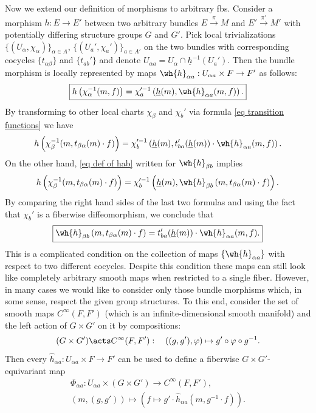 Now we extend our definition of morphisms to arbitrary \glspl{fb}. Consider a morphism $h:E\to E'$ between two arbitrary bundles $E\overset{\pi}{\to}M$ and $E'\overset{\pi'}{\to}M'$ with potentially differing structure groups $G$ and $G'$. Pick local trivializations $\{(U_\alpha,\chi_\alpha)\}_{\alpha\in A}$, $\{(U_a',\chi_a')\}_{a\in A'}$ on the two bundles with corresponding cocycles $\{t_{\alpha\beta}\}$ and $\{t_{ab}'\}$ and denote $U_{\alpha a}=U_\alpha\cap \underline{h}^{-1}(U_a')$. Then the bundle morphism is locally represented by maps
$\wh{h}_{\alpha a}:U_{\alpha a}\times F\to F'$ as follows: 
\[\boxed{h\left(\chi_\alpha^{-1}(m,f)\right)=\chi_a^{\prime-1}\left(\underline{h}(m),\wh{h}_{\alpha a}(m,f)\right).}\label{eq def of hab}\]
By transforming to other local charts $\chi_\beta$ and $\chi_b'$ via formula \eqref{eq transition functions} we have
\[h\left(\chi_\beta^{-1}(m,t_{\beta\alpha}(m)\cdot f)\right)=\chi_b^{\prime-1}\left(\underline{h}(m),t_{ba}'(\underline{h}(m))\cdot\wh{h}_{\alpha a}(m,f)\right).\]
On the other hand, \eqref{eq def of hab} written for $\wh{h}_{\beta b}$ implies
\[h\left(\chi_\beta^{-1}(m,t_{\beta\alpha}(m)\cdot f)\right)=\chi_b^{\prime-1}\left(\underline{h}(m),\wh{h}_{\beta b}\left(m,t_{\beta\alpha}(m)\cdot f\right)\right).\]
By comparing the right hand sides of the last two formulas and using the fact that $\chi_b'$ is a fiberwise diffeomorphism, we conclude that
\[\boxed{\wh{h}_{\beta b}\left(m,t_{\beta\alpha}(m)\cdot f\right)=t_{ba}'(\underline{h}(m))\cdot \wh{h}_{\alpha a}(m,f).}\label{eq transformation of hab}\]
This is a complicated condition on the collection of maps $\{\wh{h}_{\alpha a}\}$ with respect to two different cocycles. Despite this condition these maps can still look like completely arbitrary smooth maps when restricted to a single fiber. However, in many cases we would like to consider only those bundle morphisms which, in some sense, respect the given group structures. To this end, consider the set of smooth maps $C^\infty(F,F')$ (which is an infinite-dimensional smooth manifold) and the left action of $G\times G'$ on it by compositions:
\[(G\times G')\acts C^\infty(F,F'):\quad ((g,g'),\varphi)\mapsto g'\circ \varphi\circ g^{-1}.\]
Then every $\hat{h}_{\alpha a}:U_{\alpha a}\times F\to F'$ can be used to define a fiberwise $G\times G'$-equivariant map
\begin{gather}
    \varPhi_{\alpha a}: U_{\alpha a}\times (G\times G')\to C^\infty(F,F'),\\
    (m,(g,g'))\mapsto \left(f\mapsto g'\cdot \hat{h}_{\alpha a}\left(m,g^{-1}\cdot f\right)\right).\label{def Phiab}
\end{gather}
